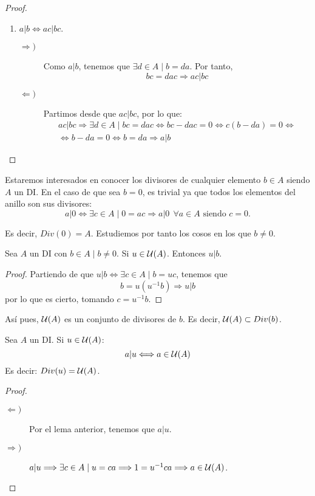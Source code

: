 \begin{proof}
\begin{enumerate}
        \item $a|b \Longleftrightarrow ac|bc$.
        \begin{description}
            \item[$\Longrightarrow)$] Como $a|b$, tenemos que $\exists d \in A \mid b=da$. Por tanto,
                $$bc = dac \Longrightarrow ac|bc$$
            \item[$\Longleftarrow)$] Partimos desde que $ac|bc$, por lo que:
                \begin{multline*}
                    ac|bc \Longrightarrow \exists d \in A \mid bc = dac \Longleftrightarrow bc-dac=0 \Longleftrightarrow c(b-da)=0 \Longleftrightarrow \\
                    \Longleftrightarrow b-da=0 \Longleftrightarrow b = da \Longrightarrow a|b
                \end{multline*}
        \end{description}
    \end{enumerate}
\end{proof}

Estaremos interesados en conocer los divisores de cualquier elemento $b \in A$ siendo $A$ un DI. En el caso de que sea $b=0$, es trivial ya que todos los elementos del anillo son sus divisores:
\begin{equation*}
    a|0 \Longleftrightarrow \exists c \in A \mid 0 = ac \Longrightarrow a|0~~\forall a \in A\mbox{ siendo } c=0.
\end{equation*}

Es decir, $Div(0)=A$. Estudiemos por tanto los cosos en los que $b\neq 0$.
\begin{lema}
    Sea $A$ un DI con $b \in A \mid b \neq 0$. Si $u \in \mathcal{U}(A)$. Entonces $u|b$.
\end{lema}
\begin{proof} Partiendo de que $u|b \Longleftrightarrow \exists c\in A \mid b=uc$, tenemos que
    $$b=u(u^{-1}b) \Longrightarrow u|b$$
    por lo que es cierto, tomando $c=u^{-1}b$.
\end{proof}

Así pues, $\mathcal{U}(A)$ es un conjunto de divisores de $b$. Es decir, $\mathcal{U}(A)\subset Div(b)$.

\begin{lema} Sea $A$ un DI. Si $u \in \mathcal{U}(A)$:
    $$a|u \Longleftrightarrow a \in \mathcal{U}(A)$$
Es decir: $Div(u) = \mathcal{U}(A)$.
\end{lema}
\begin{proof}\
\begin{description}
    \item[$\Longleftarrow)$] Por el lema anterior, tenemos que $a|u$.

    \item[$\Longrightarrow)$] $a|u \Longrightarrow \exists c \in A \mid u=ca \Longrightarrow 1=u^{-1}ca \Longrightarrow a \in \mathcal{U}(A)$.
\end{description}
\end{proof}

